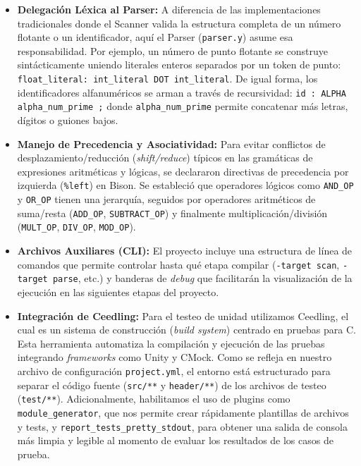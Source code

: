 \documentclass[11pt, a4paper]{article}
\begin{document}
\begin{itemize}
    \item \textbf{Delegación Léxica al Parser:} A diferencia de las implementaciones tradicionales donde el Scanner valida la estructura completa de un número flotante o un identificador, aquí el Parser (\texttt{parser.y}) asume esa responsabilidad. Por ejemplo, un número de punto flotante se construye sintácticamente uniendo literales enteros separados por un token de punto: \texttt{float\_literal: int\_literal DOT int\_literal}. De igual forma, los identificadores alfanuméricos se arman a través de recursividad: \texttt{id : ALPHA alpha\_num\_prime ;} donde \texttt{alpha\_num\_prime} permite concatenar más letras, dígitos o guiones bajos.
    
    \item \textbf{Manejo de Precedencia y Asociatividad:} Para evitar conflictos de desplazamiento/reducción (\textit{shift/reduce}) típicos en las gramáticas de expresiones aritméticas y lógicas, se declararon directivas de precedencia por izquierda (\texttt{\%left}) en Bison. Se estableció que operadores lógicos como \texttt{AND\_OP} y \texttt{OR\_OP} tienen una jerarquía, seguidos por operadores aritméticos de suma/resta (\texttt{ADD\_OP}, \texttt{SUBTRACT\_OP}) y finalmente multiplicación/división (\texttt{MULT\_OP}, \texttt{DIV\_OP}, \texttt{MOD\_OP}).
    
    \item \textbf{Archivos Auxiliares (CLI):} El proyecto incluye una estructura de línea de comandos que permite controlar hasta qué etapa compilar (\texttt{-target scan}, \texttt{-target parse}, etc.) y banderas de \textit{debug} que facilitarán la visualización de la ejecución en las siguientes etapas del proyecto.
    
    \item \textbf{Integración de Ceedling:} Para el testeo de unidad utilizamos Ceedling, el cual es un sistema de construcción (\textit{build system}) centrado en pruebas para C. Esta herramienta automatiza la compilación y ejecución de las pruebas integrando \textit{frameworks} como Unity y CMock. Como se refleja en nuestro archivo de configuración \texttt{project.yml}, el entorno está estructurado para separar el código fuente (\texttt{src/**} y \texttt{header/**}) de los archivos de testeo (\texttt{test/**}). Adicionalmente, habilitamos el uso de plugins como \texttt{module\_generator}, que nos permite crear rápidamente plantillas de archivos y tests, y \texttt{report\_tests\_pretty\_stdout}, para obtener una salida de consola más limpia y legible al momento de evaluar los resultados de los casos de prueba.
\end{itemize}
\end{document}
